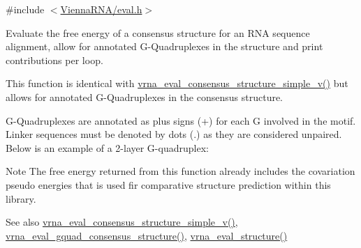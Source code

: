 {\ttfamily \#include $<$\mbox{\hyperlink{eval_8h}{Vienna\+R\+N\+A/eval.\+h}}$>$}



Evaluate the free energy of a consensus structure for an R\+NA sequence alignment, allow for annotated G-\/\+Quadruplexes in the structure and print contributions per loop. 

This function is identical with \mbox{\hyperlink{group__eval_gad88927c62ab0a8b534e078e44be1b36e}{vrna\+\_\+eval\+\_\+consensus\+\_\+structure\+\_\+simple\+\_\+v()}} but allows for annotated G-\/\+Quadruplexes in the consensus structure.

G-\/\+Quadruplexes are annotated as plus signs (\textquotesingle{}+\textquotesingle{}) for each G involved in the motif. Linker sequences must be denoted by dots (\textquotesingle{}.\textquotesingle{}) as they are considered unpaired. Below is an example of a 2-\/layer G-\/quadruplex\+: 
\begin{DoxyCode}{0}
\end{DoxyCode}


\begin{DoxyNote}{Note}
The free energy returned from this function already includes the covariation pseudo energies that is used fir comparative structure prediction within this library.
\end{DoxyNote}
\begin{DoxySeeAlso}{See also}
\mbox{\hyperlink{group__eval_gad88927c62ab0a8b534e078e44be1b36e}{vrna\+\_\+eval\+\_\+consensus\+\_\+structure\+\_\+simple\+\_\+v()}}, \mbox{\hyperlink{group__eval_gaf09a326b3d57a4b30c27bd0e216198ac}{vrna\+\_\+eval\+\_\+gquad\+\_\+consensus\+\_\+structure()}}, \mbox{\hyperlink{group__eval_ga58f199f1438d794a265f3b27fc8ea631}{vrna\+\_\+eval\+\_\+structure()}}
\end{DoxySeeAlso}

